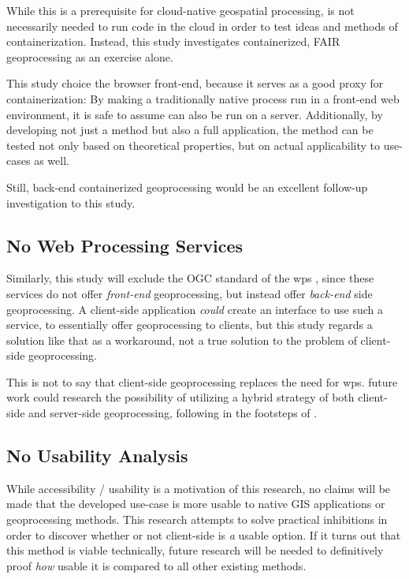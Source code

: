 While this is a prerequisite for cloud-native geospatial processing, is not necessarily needed to run code in the cloud in order to test ideas and methods of containerization. 
Instead, this study investigates containerized, FAIR geoprocessing as an exercise alone.  


This study choice the browser front-end, because it serves as a good proxy for containerization:
By making a traditionally native process run in a front-end web environment, it is safe to assume can also be run on a server. 
Additionally, by developing not just a method but also a full application, the method can be tested not only based on theoretical properties, but on actual applicability to use-cases as well. 

Still, back-end containerized geoprocessing would be an excellent follow-up investigation to this study. 

\subsection*{ No Web Processing Services } 
Similarly, this study will exclude the OGC standard of the \ac{wps} \cite{ogc_web_2015}, since these services do not offer \emph{front-end} geoprocessing, but instead offer \emph{back-end} side geoprocessing. A client-side application \textit{could} create an interface to use such a service, to essentially offer geoprocessing to clients, but this study regards a solution like that as a workaround, not a true solution to the problem of client-side geoprocessing. 

This is not to say that client-side geoprocessing replaces the need for \ac{wps}. 
future work could research the possibility of utilizing a hybrid strategy of both client-side and server-side geoprocessing, following in the footsteps of \cite{panidi_hybrid_2015}. 

\subsection*{ No Usability Analysis } %
While accessibility / usability is a motivation of this research, no claims will be made that the developed use-case is more usable to native GIS applications or geoprocessing methods. This research attempts to solve practical inhibitions in order to discover whether or not client-side is \emph{a} usable option. If it turns out that this method is viable technically, future research will be needed to definitively proof \emph{how} usable it is compared to all other existing methods.  

